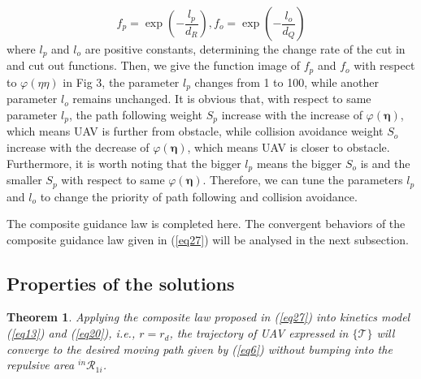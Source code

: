 \documentclass[a4paper, 10pt, conference]{ieeeconf}      %
\newtheorem{theorem}{Theorem}
\begin{document}
\begin{equation}\label{eq29}
	f_p=\exp{(-\frac{l_p}{d_R})},f_o=\exp{(-\frac{l_o}{d_Q})}
\end{equation}
where $l_p$ and $l_o$ are positive constants, determining the change rate of the cut in and cut out functions. Then, we give the function image of $f_p$ and $f_o$ with respect to $\varphi(\eta{\eta})$ in Fig 3, the parameter $l_p$ changes from 1 to 100, while another parameter $l_o$ remains unchanged. It is obvious that, with respect to same parameter $l_p$, the path following weight $S_p$ increase with the increase of $\varphi(\bm{\eta})$, which means UAV is further from obstacle, while collision avoidance weight $S_o$ increase with the decrease of $\varphi(\bm{\eta})$, which means UAV is closer to obstacle. Furthermore, it is worth noting that the bigger $l_p$ means the bigger $S_o$ is and the smaller $S_p$ with respect to same $\varphi(\bm{\eta})$. Therefore, we can tune the parameters $l_p$ and $l_o$ to change the priority of path following and collision avoidance. 

The composite guidance law is completed here. The convergent behaviors of the composite guidance law given in (\ref{eq27}) will be analysed in the next subsection.

\subsection{Properties of the solutions}

\begin{theorem}
	Applying the composite law proposed in (\ref{eq27}) into kinetics model (\ref{eq13}) and (\ref{eq20}), i.e., $r=r_d$, the trajectory of UAV expressed in $\{\mathcal{T}\}$ will converge to the desired moving path given by (\ref{eq6}) without bumping into the repulsive area $^{in}\mathcal{R}_{1i}$. 
\end{theorem}
\end{document}
